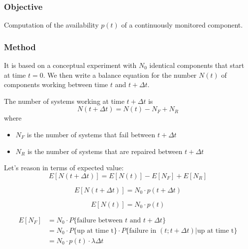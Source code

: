 \subsubsection*{Objective}
Computation of the availability $p(t)$ of a continuously monitored component.

\subsubsection*{Method}
It is based on a conceptual experiment with $N_0$ identical components that
start at time $t=0$. We then write a balance equation for the number $N(t)$ of
components working between time $t$ and $t+\Delta t$.


The number of systems working at time $t+\Delta t$ is
\begin{equation*}
    N(t+\Delta t) = N(t) - N_F + N_R
\end{equation*}
where
\begin{itemize}
    \item $N_F$ is the number of systems that fail between $t+\Delta t$
    \item $N_R$ is the number of systems that are repaired between $t+\Delta t$
\end{itemize}

Let's reason in terms of expected value:
\begin{equation*}
    E[N(t+\Delta t)] = E[N(t)] - E[N_F] + E[N_R]
\end{equation*}

\begin{equation*}
    E[N(t+\Delta t)] = N_0\cdot p(t+\Delta t)
\end{equation*}

\begin{equation*}
    E[N(t)]=N_0\cdot p(t)
\end{equation*}

\begin{equation*}
    \begin{split}
        E[N_F] &= N_0\cdot P\{\text{failure between $t$ and $t+\Delta t$}\} \\
        &= N_0\cdot P\{\text{up at time t}\}\cdot P\{\text{failure in }(t;t+\Delta t)|\text{up at time t}\}  \\
        &= N_0\cdot p(t)\cdot \lambda \Delta t
    \end{split}
\end{equation*}


